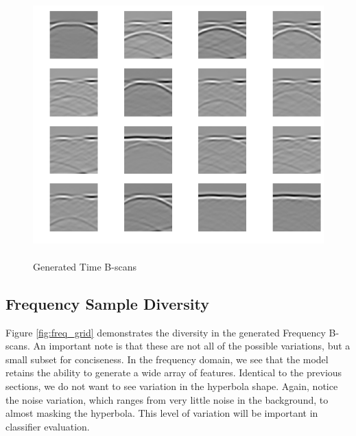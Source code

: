 \begin{figure}[H]
    \centering
    \includegraphics[width=\linewidth]{figures/generated_grid.png}
    \caption{\\Generated Time B-scans}
    \label{fig:grid}
\end{figure}

\subsection{Frequency Sample Diversity}
\hspace{0.5in}Figure \ref{fig:freq_grid} demonstrates the diversity in the generated Frequency B-scans. An important note is that these are not all of the possible variations, but a small subset for conciseness. In the frequency domain, we see that the model retains the ability to generate a wide array of features. Identical to the previous sections, we do not want to see variation in the hyperbola shape. Again, notice the noise variation, which ranges from very little noise in the background, to almost masking the hyperbola. This level of variation will be important in classifier evaluation.
\vspace{0.5\baselineskip}

